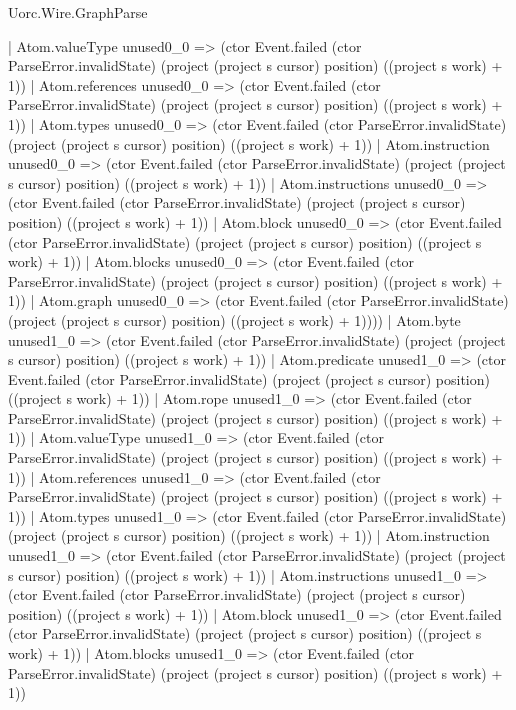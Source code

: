 \begin{lexlean}{Uorc.Wire.GraphParse}
\begin{semanticmodule}
{              | Atom.valueType unused0_0 => (ctor Event.failed (ctor ParseError.invalidState) (project (project s cursor) position) ((project s work) + 1))
              | Atom.references unused0_0 => (ctor Event.failed (ctor ParseError.invalidState) (project (project s cursor) position) ((project s work) + 1))
              | Atom.types unused0_0 => (ctor Event.failed (ctor ParseError.invalidState) (project (project s cursor) position) ((project s work) + 1))
              | Atom.instruction unused0_0 => (ctor Event.failed (ctor ParseError.invalidState) (project (project s cursor) position) ((project s work) + 1))
              | Atom.instructions unused0_0 => (ctor Event.failed (ctor ParseError.invalidState) (project (project s cursor) position) ((project s work) + 1))
              | Atom.block unused0_0 => (ctor Event.failed (ctor ParseError.invalidState) (project (project s cursor) position) ((project s work) + 1))
              | Atom.blocks unused0_0 => (ctor Event.failed (ctor ParseError.invalidState) (project (project s cursor) position) ((project s work) + 1))
              | Atom.graph unused0_0 => (ctor Event.failed (ctor ParseError.invalidState) (project (project s cursor) position) ((project s work) + 1))))
          | Atom.byte unused1_0 => (ctor Event.failed (ctor ParseError.invalidState) (project (project s cursor) position) ((project s work) + 1))
          | Atom.predicate unused1_0 => (ctor Event.failed (ctor ParseError.invalidState) (project (project s cursor) position) ((project s work) + 1))
          | Atom.rope unused1_0 => (ctor Event.failed (ctor ParseError.invalidState) (project (project s cursor) position) ((project s work) + 1))
          | Atom.valueType unused1_0 => (ctor Event.failed (ctor ParseError.invalidState) (project (project s cursor) position) ((project s work) + 1))
          | Atom.references unused1_0 => (ctor Event.failed (ctor ParseError.invalidState) (project (project s cursor) position) ((project s work) + 1))
          | Atom.types unused1_0 => (ctor Event.failed (ctor ParseError.invalidState) (project (project s cursor) position) ((project s work) + 1))
          | Atom.instruction unused1_0 => (ctor Event.failed (ctor ParseError.invalidState) (project (project s cursor) position) ((project s work) + 1))
          | Atom.instructions unused1_0 => (ctor Event.failed (ctor ParseError.invalidState) (project (project s cursor) position) ((project s work) + 1))
          | Atom.block unused1_0 => (ctor Event.failed (ctor ParseError.invalidState) (project (project s cursor) position) ((project s work) + 1))
          | Atom.blocks unused1_0 => (ctor Event.failed (ctor ParseError.invalidState) (project (project s cursor) position) ((project s work) + 1))
}
\end{semanticmodule}
\end{lexlean}
